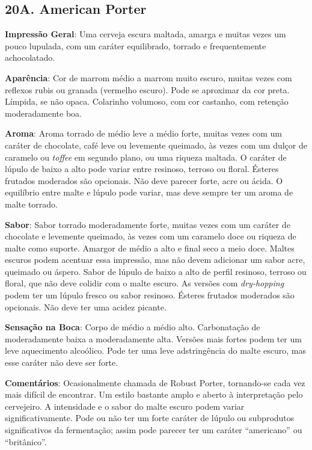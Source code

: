 \subsection*{20A. American Porter}
\textbf{Impressão Geral}: Uma cerveja escura maltada, amarga e muitas vezes um pouco lupulada, com um caráter equilibrado, torrado e frequentemente achocolatado.

\textbf{Aparência}: Cor de marrom médio a marrom muito escuro, muitas vezes com reflexos rubis ou granada (vermelho escuro). Pode se aproximar da cor preta. Límpida, se não opaca. Colarinho volumoso, com cor castanho, com retenção moderadamente boa.

\textbf{Aroma}: Aroma torrado de médio leve a médio forte, muitas vezes com um caráter de chocolate, café leve ou levemente queimado, às vezes com um dulçor de caramelo ou \textit{toffee} em segundo plano, ou uma riqueza maltada. O caráter de lúpulo de baixo a alto pode variar entre resinoso, terroso ou floral. Ésteres frutados moderados são opcionais. Não deve parecer forte, acre ou ácida. O equilíbrio entre malte e lúpulo pode variar, mas deve sempre ter um aroma de malte torrado.

\textbf{Sabor}: Sabor torrado moderadamente forte, muitas vezes com um caráter de chocolate e levemente queimado, às vezes com um caramelo doce ou riqueza de malte como suporte. Amargor de médio a alto e final seco a meio doce. Maltes escuros podem acentuar essa impressão, mas não devem adicionar um sabor acre, queimado ou áspero. Sabor de lúpulo de baixo a alto de perfil resinoso, terroso ou floral, que não deve colidir com o malte escuro. As versões com \textit{dry-hopping} podem ter um lúpulo fresco ou sabor resinoso. Ésteres frutados moderados são opcionais. Não deve ter uma acidez picante.

\textbf{Sensação na Boca}: Corpo de médio a médio alto. Carbonatação de moderadamente baixa a moderadamente alta. Versões mais fortes podem ter um leve aquecimento alcoólico. Pode ter uma leve adstringência do malte escuro, mas esse caráter não deve ser forte.

\textbf{Comentários}: Ocasionalmente chamada de Robust Porter, tornando-se cada vez mais difícil de encontrar. Um estilo bastante amplo e aberto à interpretação pelo cervejeiro. A intensidade e o sabor do malte escuro podem variar significativamente. Pode ou não ter um forte caráter de lúpulo ou subprodutos significativos da fermentação; assim pode parecer ter um caráter “americano” ou “britânico”.

